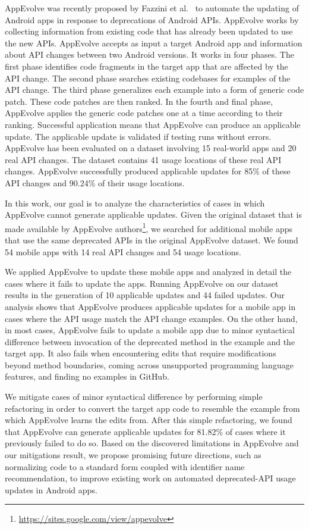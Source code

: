 AppEvolve was recently proposed by Fazzini et al.~\cite{fazzini2019automated} to
automate the updating of Android apps in response to deprecations of
Android APIs.  AppEvolve works by collecting information from existing code
that has already been updated to use the new APIs. 
AppEvolve accepts as input a target Android app and information about API changes between two Android versions. It works in four phases. The first phase identifies code fragments in the target app that are affected by the API change. The second phase searches existing codebases for examples of the API change. The third phase generalizes each example into a form of generic code patch. These code patches are then ranked. In the fourth and final phase, AppEvolve applies the generic code patches one at a time according to their ranking. Successful application means that AppEvolve can produce an applicable  update. The applicable update is validated if testing runs without errors. AppEvolve has been evaluated on a dataset involving 15 real-world apps and 20 real API changes. The dataset contains 41 usage locations of these real API changes. AppEvolve successfully produced applicable updates for 85\% of these API changes and 90.24\% of their usage locations. 

In this work, our goal is to analyze the characteristics of cases in which AppEvolve cannot generate applicable updates. Given the original dataset that is made available by AppEvolve authors\footnote{\url{https://sites.google.com/view/appevolve}}, we searched for additional mobile apps that use the same deprecated APIs in the original AppEvolve dataset. We found 54 mobile apps with 14 real API changes and 54 usage locations. 

We applied AppEvolve to update these mobile apps and analyzed in detail the cases where it fails to update the apps. Running AppEvolve on our dataset results in the generation of 10 applicable updates and 44 failed updates. Our analysis shows that AppEvolve produces applicable updates for a mobile app in cases where the API usage match the API change examples.  On the other hand, in most cases, AppEvolve fails to update a mobile app due to minor syntactical difference between invocation of the deprecated method in the example and the target app. It also fails when encountering edits that require modifications beyond method boundaries, coming across unsupported programming language features, and finding no examples  in GitHub.

We mitigate cases of minor syntactical difference by performing simple refactoring in order to convert the target app code to resemble the example from which AppEvolve learns the edits from. After this simple refactoring, we found that AppEvolve can generate applicable updates for 81.82\% of cases where it previously failed to do so. Based on the discovered limitations in AppEvolve and our mitigations result, we propose promising future directions, such as normalizing code to a standard form coupled with identifier name recommendation, to improve existing work on automated deprecated-API usage updates in Android apps.

